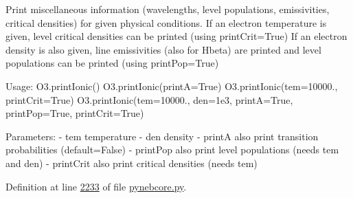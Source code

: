 \begin{DoxyVerb}Print miscellaneous information (wavelengths, level populations, emissivities, 
    critical densities) for given physical conditions.
If an electron temperature is given, level critical densities can be printed 
    (using printCrit=True)
If an electron density is also given, line emissivities (also for Hbeta) are printed and level 
    populations can be printed (using printPop=True)

Usage:
    O3.printIonic()
    O3.printIonic(printA=True)
    O3.printIonic(tem=10000., printCrit=True)
    O3.printIonic(tem=10000., den=1e3, printA=True, printPop=True, printCrit=True)

Parameters:
    - tem          temperature
    - den          density
    - printA       also print transition probabilities (default=False)
    - printPop     also print level populations (needs tem and den)
    - printCrit    also print critical densities (needs tem)\end{DoxyVerb}
 

Definition at line \hyperlink{pynebcore_8py_source_l02233}{2233} of file \hyperlink{pynebcore_8py_source}{pynebcore.\-py}.



